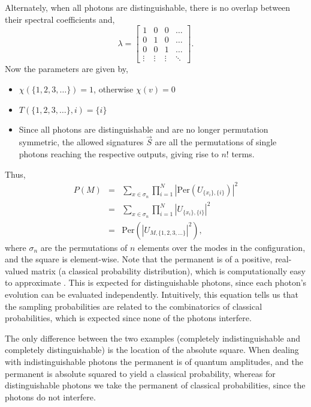 \documentclass[aps,prl,twocolumn,amsmath,amssymb,nofootinbib,superscriptaddress]{revtex4}
\begin{document}
Alternately, when all photons are distinguishable, there is no overlap between their spectral coefficients and,
\begin{equation}
\lambda =
\left[ \begin{array}{cccc}
1 & 0 & 0 & \ldots \\
0 & 1 & 0 & \ldots \\
0 & 0 & 1 & \ldots \\
\vdots & \vdots & \vdots & \ddots
\end{array} \right].
\end{equation}
Now the parameters are given by,
\begin{itemize}
\item \mbox{$\chi(\{1,2,3,\dots\})=1$}, otherwise \mbox{$\chi(v)=0$}
\item \mbox{$T(\{1,2,3,\dots\},i)=\{i\}$}
\item Since all photons are distinguishable and are no longer permutation symmetric, the allowed signatures $\vec{S}$ are all the permutations of single photons reaching the respective outputs, giving rise to $n!$ terms.
\end{itemize}
Thus,
\begin{eqnarray}
P(M) &=& \sum_{x\in \sigma_n} \prod_{i=1}^N \left|\mathrm{Per}\left(U_{\{x_i\},\{i\}}\right)\right|^2 \\ \nonumber
&=& \sum_{x\in \sigma_n} \prod_{i=1}^N \left|U_{\{x_i\},\{i\}}\right|^2 \\ \nonumber
&=& \mathrm{Per}\left(\left|U_{M,\{1,2,3,\dots\}}\right|^2\right),
\end{eqnarray}
where $\sigma_n$ are the permutations of $n$ elements over the modes in the configuration, and the square is element-wise. Note that the permanent is of a positive, real-valued matrix (a classical probability distribution), which is computationally easy to approximate \cite{bib:SinclairPerm}. This is expected for distinguishable photons, since each photon's evolution can be evaluated independently. Intuitively, this equation tells us that the sampling probabilities are related to the combinatorics of classical probabilities, which is expected since none of the photons interfere.

The only difference between the two examples (completely indistinguishable and completely distinguishable) is the location of the absolute square. When dealing with indistinguishable photons the permanent is of quantum amplitudes, and the permanent is absolute squared to yield a classical probability, whereas for distinguishable photons we take the permanent of classical probabilities, since the photons do not interfere.
\end{document}
